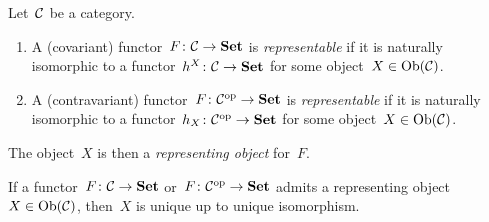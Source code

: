 \begin{definition}
  Let~$\mathcal{C}$ be a category.
  \begin{enumerate}
    \item
      A (covariant) functor~$F \colon \mathcal{C} \to \mathbf{Set}$ is \emph{representable} if it is naturally isomorphic to a functor~$h^X \colon \mathcal{C} \to \mathbf{Set}$ for some object~$X \in \operatorname{Ob}(\mathcal{C})$.
    \item
      A (contravariant) functor~$F \colon \mathcal{C}^{\mathrm{op}} \to \mathbf{Set}$ is \emph{representable} if it is naturally isomorphic to a functor~$h_X \colon \mathcal{C}^{\mathrm{op}} \to \mathbf{Set}$ for some object~$X \in \operatorname{Ob}(\mathcal{C})$.
  \end{enumerate}
  The object~$X$ is then a \emph{representing object} for~$F$.
\end{definition}


\begin{remark*}
  If a functor~$F \colon \mathcal{C} \to \mathbf{Set}$ or~$F \colon \mathcal{C}^{\mathrm{op}} \to \mathbf{Set}$ admits a representing object~$X \in \operatorname{Ob}(\mathcal{C})$, then~$X$ is unique up to unique isomorphism.
\end{remark*}




